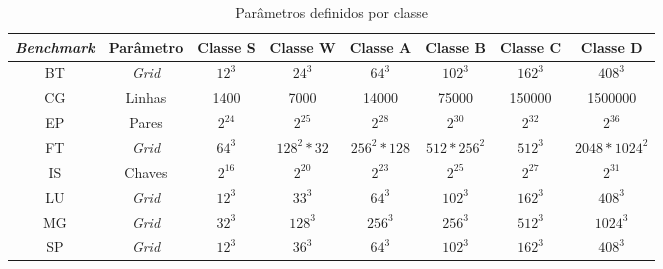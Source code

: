   \begin{table}[H]
    \centering
    \footnotesize
    \setlength{\abovecaptionskip}{0pt}
    \setlength{\belowcaptionskip}{0pt}
    \caption[Parâmetros definidos por classe]{Parâmetros definidos por classe}
    \label{tab:classesNas}
    \begin{tabular}{c|c|c|c|c|c|c|c}
	\hline \hline
	\textit{Benchmark} &	Parâmetro &	Classe S &	Classe W &	Classe A &	Classe B &	Classe C &	Classe D \\ 
	\hline \hline
 	BT & \textit{Grid}	& $12^3$	& $24^3$ 	& $64^3$	& $102^3$ 	& $162^3$	& $408^3$ \\ 
	CG & Linhas		& 1400		& 7000 		& 14000 	& 75000 	& 150000 	& 1500000 \\ 
	EP & Pares 		& $2^{24}$	& $2^{25}$	& $2^{28}$	& $2^{30}$	& $2^{32}$	& $2^{36}$ \\
	FT & \textit{Grid}	& $64^3$	& $128^2*32$	& $256^2*128$	& $512*256^2$	& $512^3$	& $2048*1024^2$ \\ 
	IS & Chaves		& $2^{16}$	& $2^{20}$	& $2^{23}$	& $2^{25}$	& $2^{27}$	& $2^{31}$ \\ 
	LU & \textit{Grid}	& $12^3$	& $33^3$	& $64^3$	& $102^3$	& $162^3$	& $408^3$ \\
	MG & \textit{Grid}	& $32^3$	& $128^3$	& $256^3$	& $256^3$	& $512^3$	& $1024^3$ \\ 
	SP & \textit{Grid}	& $12^3$	& $36^3$	& $64^3$	& $102^3$	& $162^3$	& $408^3$ \\
	\hline \hline
    \end{tabular}
  \end{table}